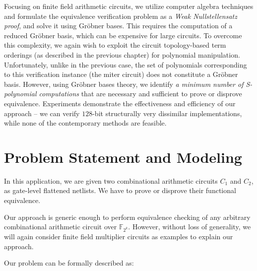 Focusing on finite field arithmetic circuits, we utilize computer
algebra techniques and formulate the equivalence verification problem
as a  {\it Weak Nullstellensatz proof}, and solve it using Gr\"obner
bases. This requires the computation of a reduced Gr\"obner
basis, which can be expensive for large circuits.  To overcome this
complexity, we again wish to exploit the circuit topology-based term
orderings (as described in the previous chapter) for polynomial
manipulation.  Unfortunately, unlike in the previous case, 
the set of polynomials corresponding to this verification instance
(the miter circuit) does  not constitute a Gr\"obner basis. However,
using Gr\"obner bases theory,  we identify {\it a minimum number of
  S-polynomial computations} that are necessary and sufficient to
prove or disprove equivalence. Experiments demonstrate the
effectiveness and efficiency of our approach --  we can verify
$128$-bit structurally very dissimilar implementations, while none of
the contemporary methods are feasible. 

\section{Problem Statement and Modeling}

In this application, we are given two combinational arithmetic
circuits $C_{1}$ and $C_{2}$, as gate-level flattened netlists. 
We have to prove or disprove their functional equivalence. 

Our approach is generic enough to perform equivalence checking of
any arbitrary combinational arithmetic circuit over
$\mathbb{F}_{2^k}$. However, without loss of generality, we will again
consider finite field multiplier circuits as examples to explain our approach.

Our problem can be formally described as:

